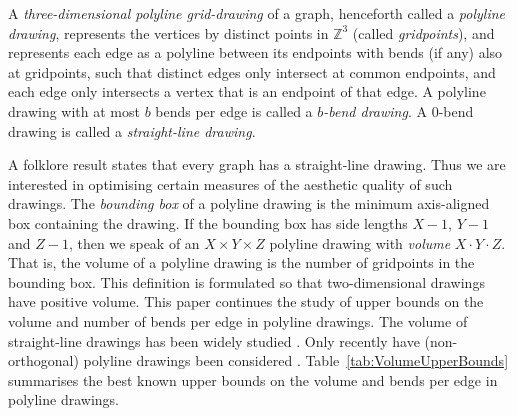 \documentclass[a4paper]{article}
\newcommand{\tabref}[1]{Table~\ref{tab:#1}}
\theoremstyle{plain}
\begin{document}
A \emph{three-dimensional polyline grid-drawing} of a graph, henceforth called a \emph{polyline drawing}, represents the vertices by distinct points in $\mathbb{Z}^3$ (called \emph{gridpoints}), and represents each edge as a polyline between its endpoints with bends (if any) also at gridpoints, such that distinct edges only intersect at common endpoints, and each edge only intersects a vertex that is an endpoint of that edge. A polyline drawing with at most $b$ bends per edge is called a \emph{$b$-bend drawing}. A $0$-bend drawing is called a \emph{straight-line drawing}. 

A folklore result states that every graph has a straight-line drawing. Thus we are interested in optimising certain  measures of the aesthetic quality of such drawings.  The \emph{bounding box} of a polyline drawing  is the minimum axis-aligned box containing the drawing. If the bounding box has side lengths $X-1$, $Y-1$ and $Z-1$, then  we speak of an $X\times Y\times Z$ polyline drawing with \emph{volume} $X\cdot Y\cdot Z$. That is, the volume of a polyline drawing is the number of gridpoints in the bounding box.   This definition is formulated so that two-dimensional drawings have positive volume.  This paper continues the study of upper bounds on the volume  and number of bends per edge in polyline drawings. The volume of straight-line drawings has been widely studied \citep{DujWoo-SubQuad-AMS, Giacomo-GD03, DM-GD03, Hasunuma-GD03, CS-IPL97, DujWoo-Subdivisions-DMTCS, CELR-Algo96, DMW-SJC05, FLW-JGAA03, PTT99, BCMW-JGAA04}.  Only recently have (non-orthogonal) polyline drawings been considered \citep{DujWoo-Subdivisions-DMTCS, Wismath-TR04}. \tabref{VolumeUpperBounds} summarises the best known upper bounds on the volume and bends per edge in polyline drawings. 
\end{document}
